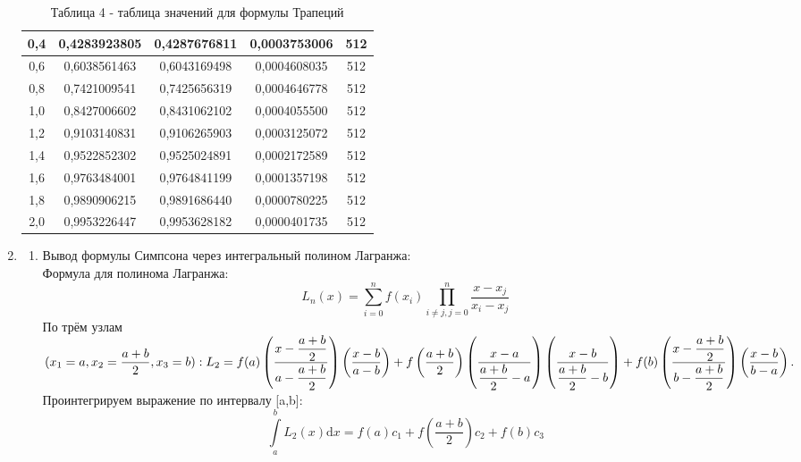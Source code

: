 \documentclass[14pt]{article}
\begin{document}
\begin{enumerate}[label = \arabic*.]
{\begin{table}[h]
\begin{tabular}{|c|c|c|c|c|}
            \hline
            0,4 & 0,4283923805 & 0,4287676811 & 0,0003753006 & 512\\
            \hline
            0,6 & 0,6038561463 & 0,6043169498 & 0,0004608035 & 512\\
            \hline
            0,8 & 0,7421009541 & 0,7425656319 & 0,0004646778 & 512\\
            \hline
            1,0 & 0,8427006602 & 0,8431062102 & 0,0004055500 & 512\\
            \hline
            1,2 & 0,9103140831 & 0,9106265903 & 0,0003125072 & 512\\
            \hline
            1,4 & 0,9522852302 & 0,9525024891 & 0,0002172589 & 512\\
            \hline
            1,6 & 0,9763484001 & 0,9764841199 & 0,0001357198 & 512\\
            \hline
            1,8 & 0,9890906215 & 0,9891686440 & 0,0000780225 & 512\\
            \hline
            2,0 & 0,9953226447 & 0,9953628182 & 0,0000401735 & 512\\
            \hline
          \end{tabular}
          \caption*{\small{Таблица 4 - таблица значений для формулы Трапеций}}
        \end{table}
    }
    \item
        \begin{enumerate}
            \item {Вывод формулы Симпсона через интегральный полином Лагранжа:\\
            Формула для полинома Лагранжа:
            \begin{equation}
                L_n(x) = \sum_{i=0}^{n}f(x_i)\prod_{i \ne j, j = 0}^{n}\frac{x - x_j}{x_i - x_j}
            \end{equation}
            По трём узлам $(x_1 = a, x_2 = \dfrac{a+b}{2}, x_3 = b):
            L_2 = f(a)\left(\dfrac{x - \dfrac{a+b}{2}}{a - \dfrac{a+b}{2}}\right)\left(\dfrac{x - b}{a - b}\right)+\\
            f\left(\dfrac{a +b}{2}\right)\left(\dfrac{x-a}{\dfrac{a+b}{2} - a}\right)\left(\dfrac{x-b}{\dfrac{a+b}{2} - b}\right)+ f(b)\left(\dfrac{x - \dfrac{a+b}{2}}{b - \dfrac{a+b}{2}}\right)\left(\dfrac{x - b}{b - a}\right).$\\
            \hfill\break
            Проинтегрируем выражение по интервалу [a,b]:
            \begin{equation}
                \int\limits_{a}^{b}L_2(x)\mathrm{d}x = f(a)c_1 + f\left(\frac{a+b}{2}\right)c_2 + f(b)c_3

\end{equation}}
\end{enumerate}
\end{enumerate}
\end{document}
